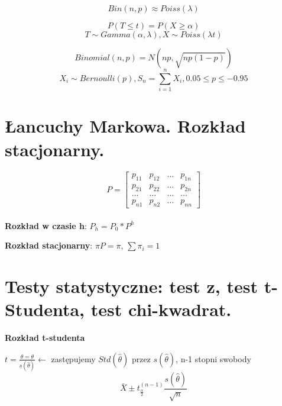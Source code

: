 \documentclass[12pt]{article}
\begin{document}
    \begin{equation}
        Bin(n, p) \approx Poiss(\lambda)
    \end{equation}

    \begin{equation}
        P(T \leq t) = P( X \geq \alpha)
    \end{equation}
    \begin{equation*}
        T \sim Gamma(\alpha, \lambda), X \sim Poiss(\lambda t)
    \end{equation*}

    \begin{equation}
        Binomial(n, p) = N(np, \sqrt{np(1-p)})
    \end{equation}
    \begin{equation*}
        X_i \sim Bernoulli(p), S_n = \sum_{i=1}^{n} X_i, 0.05 \leq p \leq -0.95
    \end{equation*}

    \newpage

    \section{Łancuchy Markowa. Rozkład stacjonarny.}

    \begin{equation*}
        P =
        \begin{bmatrix}
            p_{1 1} & p_{1 2} & \dots & p_{1 n}\\
            p_{2 1} & p_{2 2} & \dots & p_{2 n}\\
            \dots & \dots & \dots & \dots\\
            p_{n 1} & p_{n 2} & \dots & p_{n n}
        \end{bmatrix}
    \end{equation*}
    \hfill \\

    \textbf{Rozkład w czasie h}: $P_h = P_0 * P^h$

    \textbf{Rozkład stacjonarny}: $\pi P = \pi$, $\sum \pi_i = 1$

    \newpage

    \section{Testy statystyczne: test z, test t-Studenta, test chi-kwadrat.}

    \textbf{Rozkład t-studenta}

    $t = \frac{\hat{\theta} = \theta}{s(\hat{\theta})} \leftarrow$ zastępujemy $Std(\hat{\theta})$ przez $s(\hat{\theta})$,
    n-1 stopni swobody
    \begin{equation*}
        \bar{X} \pm t_{\frac{\alpha}{2}}^{(n-1)} \frac{s(\hat{\theta})}{\sqrt{n}}
    \end{equation*}
\end{document}

